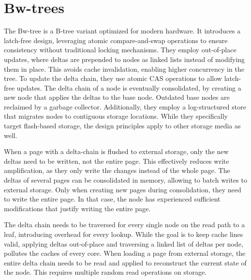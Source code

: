 \section{Bw-trees}
\label{sec:related-work-bwtrees}
The Bw-tree \cite{levandoski2013bw} is a B-tree variant optimized for modern hardware.
It introduces a latch-free design, leveraging atomic compare-and-swap operations to ensure consistency without traditional locking mechanisms.
They employ out-of-place updates, where deltas are prepended to nodes as linked lists instead of modifying them in place.
This avoids cache invalidation, enabling higher concurrency in the tree.
To update the delta chain, they use atomic \ac{CAS} operations to allow latch-free updates.
The delta chain of a node is eventually consolidated, by creating a new node that applies the deltas to the base node.
Outdated base nodes are reclaimed by a garbage collector.
Additionally, they employ a log-structured store that migrates nodes to contiguous storage locations.
While they specifically target flash-based storage, the design principles apply to other storage media as well.

When a page with a delta-chain is flushed to external storage, only the new deltas need to be written, not the entire page.
This effectively reduces write amplification, as they only write the changes instead of the whole page.
The deltas of several pages can be consolidated in memory, allowing to batch writes to external storage.
Only when creating new pages during consolidation, they need to write the entire page.
In that case, the node has experienced sufficient modifications that justify writing the entire page.

The delta chain needs to be traversed for every single node on the read path to a leaf, introducing overhead for every lookup.
While the goal is to keep cache lines valid, applying deltas out-of-place and traversing a linked list of deltas per node, pollutes the caches of every core.
When loading a page from external storage, the entire delta chain needs to be read and applied to reconstruct the current state of the node.
This requires multiple random read operations on storage.

